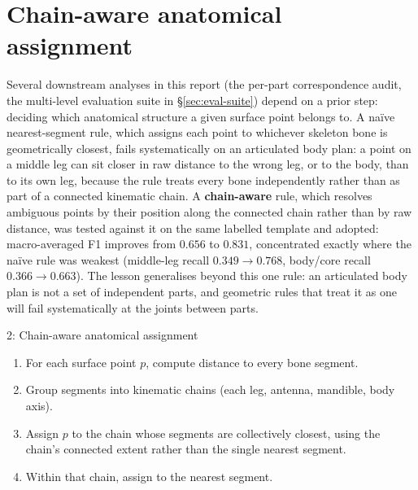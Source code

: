 \section{Chain-aware anatomical assignment}
\label{sec:chain-aware}

Several downstream analyses in this report (the per-part correspondence
audit, the multi-level evaluation suite in \S\ref{sec:eval-suite})
depend on a prior step: deciding which anatomical structure a given surface
point belongs to. A naïve nearest-segment rule, which assigns each point to
whichever skeleton bone is geometrically closest, fails systematically on an
articulated body plan: a point on a middle leg can sit closer in raw
distance to the wrong leg, or to the body, than to its own leg, because the
rule treats every bone independently rather than as part of a connected
kinematic chain. A \textbf{chain-aware} rule, which resolves ambiguous
points by their position along the connected chain rather than by raw
distance, was tested against it on the same labelled template and adopted:
macro-averaged F1 improves from $0.656$ to $0.831$, concentrated exactly
where the naïve rule was weakest (middle-leg recall $0.349\to0.768$,
body/core recall $0.366\to0.663$). The lesson generalises beyond this one
rule: an articulated body plan is not a set of independent parts, and
geometric rules that treat it as one will fail systematically at the joints
between parts.

\begin{algbox}{2: Chain-aware anatomical assignment}
\begin{enumerate}[nosep,leftmargin=1.4em]
\item For each surface point $p$, compute distance to every bone segment.
\item Group segments into kinematic chains (each leg, antenna, mandible, body axis).
\item Assign $p$ to the chain whose segments are collectively closest, using
the chain's connected extent rather than the single nearest segment.
\item Within that chain, assign to the nearest segment.
\end{enumerate}
\end{algbox}
